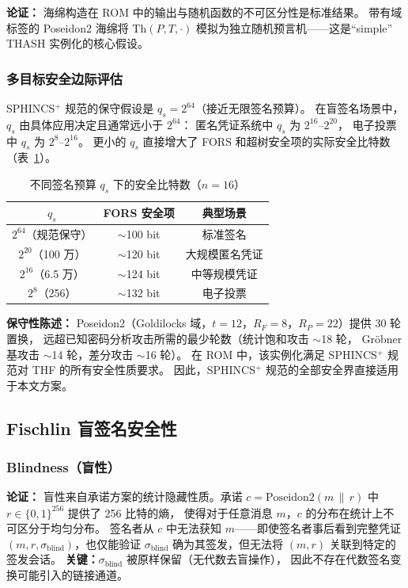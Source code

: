 \documentclass[11pt,a4paper]{ctexart}
\begin{document}
\textbf{论证：}
海绵构造在 ROM 中的输出与随机函数的不可区分性是标准结果。
带有域标签的 Poseidon2 海绵将 $\mathrm{Th}(P, T, \cdot)$
模拟为独立随机预言机——这是``simple'' THASH 实例化的核心假设。

\subsubsection{多目标安全边际评估}

SPHINCS$^+$ 规范的保守假设是 $q_s = 2^{64}$（接近无限签名预算）。
在盲签名场景中，$q_s$ 由具体应用决定且通常远小于 $2^{64}$：
匿名凭证系统中 $q_s$ 为 $2^{16}$--$2^{20}$，
电子投票中 $q_s$ 为 $2^8$--$2^{16}$。
更小的 $q_s$ 直接增大了 FORS 和超树安全项的实际安全比特数（表~\ref{tab:security}）。

\begin{table}[h]
\centering
\caption{不同签名预算 $q_s$ 下的安全比特数（$n=16$）}
\label{tab:security}
\begin{tabular}{@{}ccc@{}}
\toprule
$q_s$               & FORS 安全项 & 典型场景 \\
\midrule
$2^{64}$（规范保守） & $\sim$100 bit & 标准签名 \\
$2^{20}$（100 万）  & $\sim$120 bit & 大规模匿名凭证 \\
$2^{16}$（6.5 万）  & $\sim$124 bit & 中等规模凭证 \\
$2^8$（256）        & $\sim$132 bit & 电子投票 \\
\bottomrule
\end{tabular}
\end{table}

\textbf{保守性陈述：}
Poseidon2（Goldilocks 域，$t=12$，$R_F=8$，$R_P=22$）提供 30 轮置换，
远超已知密码分析攻击所需的最少轮数（统计饱和攻击 $\sim$18 轮，
Gr\"obner 基攻击 $\sim$14 轮，差分攻击 $\sim$16 轮）。
在 ROM 中，该实例化满足 SPHINCS$^+$ 规范对 THF 的所有安全性质要求。
因此，SPHINCS$^+$ 规范的全部安全界直接适用于本文方案。

\subsection{Fischlin 盲签名安全性}

\subsubsection{Blindness（盲性）}

\textbf{论证：}
盲性来自承诺方案的统计隐藏性质。承诺 $c = \mathrm{Poseidon2}(m \,\|\, r)$
中 $r \in \{0,1\}^{256}$ 提供了 256 比特的熵，
使得对于任意消息 $m$，$c$ 的分布在统计上不可区分于均匀分布。
签名者从 $c$ 中无法获知 $m$——即使签名者事后看到完整凭证
$(m, r, \sigma_{\mathrm{blind}})$，也仅能验证 $\sigma_{\mathrm{blind}}$
确为其签发，但无法将 $(m, r)$ 关联到特定的签发会话。
\textbf{关键：}$\sigma_{\mathrm{blind}}$ 被原样保留（无代数去盲操作），
因此不存在代数签名变换可能引入的链接通道。
\end{document}
